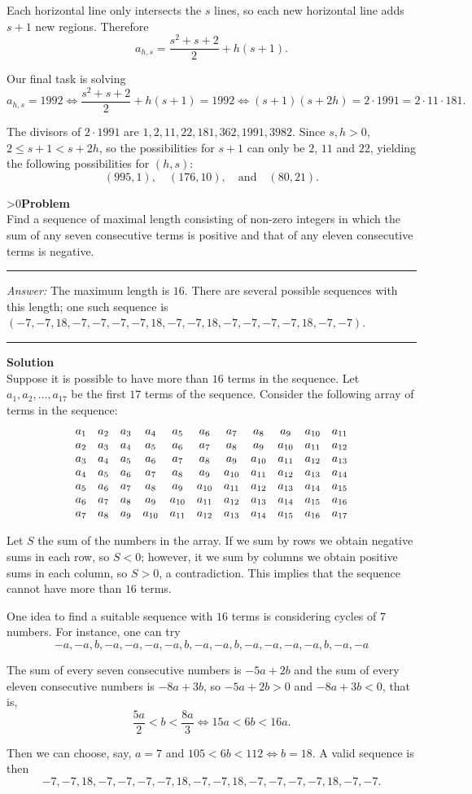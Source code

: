 \documentclass[12pt,oneside,a4paper]{book}
\newcounter{probnum}
\newcounter{solnum}
\newcommand{\prob}{\ifnum\value{probnum}>0\newpage\fi\setcounter{solnum}{0}\stepcounter{probnum}\textbf{Problem \theprobnum}\\}
\newcommand{\ans}{\medskip\hrule\medbreak\emph{Answer: }}
\newcommand{\sol}{\medskip\hrule\medbreak\textbf{Solution}\\}
\begin{document}
Each horizontal line only intersects the $s$ lines, so each new horizontal line adds $s+1$ new regions. Therefore
\[a_{h,s} = \frac{s^2+s+2}2 + h(s+1).\]

Our final task is solving
\[a_{h,s} = 1992\iff \frac{s^2+s+2}2 + h(s+1) = 1992 \iff (s+1)(s+2h) = 2\cdot 1991 = 2\cdot 11\cdot 181.\]

The divisors of $2\cdot 1991$ are $1,2,11,22,181,362,1991,3982$. Since $s,h>0$, $2\le s+1<s+2h$, so the possibilities for $s+1$ can only be $2$, $11$ and $22$, yielding the following possibilities for $(h,s)$:
\[(995,1),\quad (176,10),\quad\text{and}\quad (80,21).\]

\prob Find a sequence of maximal length consisting of non-zero integers in which the sum of any seven consecutive terms is positive and that of any eleven consecutive terms is negative.

\ans The maximum length is $16$. There are several possible sequences with this length; one such sequence is $(-7,-7,18,-7,-7,-7,-7,18,-7,-7,18,-7,-7,-7,-7,18,-7,-7)$.

\sol
Suppose it is possible to have more than $16$ terms in the sequence. Let $a_1,a_2,\ldots,a_{17}$ be the first $17$ terms of the sequence. Consider the following array of terms in the sequence:
\[\setcounter{MaxMatrixCols}{11}
\begin{matrix}
a_1& a_2& a_3& a_4& a_5& a_6& a_7& a_8& a_9& a_{10}& a_{11}\\
a_2& a_3& a_4& a_5& a_6& a_7& a_8& a_9& a_{10}& a_{11}& a_{12}\\
a_3& a_4& a_5& a_6& a_7& a_8& a_9& a_{10}& a_{11}& a_{12}& a_{13}\\
a_4& a_5& a_6& a_7& a_8& a_9& a_{10}& a_{11}& a_{12}& a_{13}& a_{14}\\
a_5& a_6& a_7& a_8& a_9& a_{10}& a_{11}& a_{12}& a_{13}& a_{14}& a_{15}\\
a_6& a_7& a_8& a_9& a_{10}& a_{11}& a_{12}& a_{13}& a_{14}& a_{15}& a_{16}\\
a_7& a_8& a_9& a_{10}& a_{11}& a_{12}& a_{13}& a_{14}& a_{15}& a_{16}& a_{17}
\end{matrix}\]

Let $S$ the sum of the numbers in the array. If we sum by rows we obtain negative sums in each row, so $S<0$; however, it we sum by columns we obtain positive sums in each column, so $S>0$, a contradiction. This implies that the sequence cannot have more than $16$ terms.

One idea to find a suitable sequence with $16$ terms is considering cycles of $7$ numbers. For instance, one can try
\[-a,-a,b,-a,-a,-a,-a,b,-a,-a,b,-a,-a,-a,-a,b,-a,-a\]

The sum of every seven consecutive numbers is $-5a+2b$ and the sum of every eleven consecutive numbers is $-8a+3b$, so $-5a+2b > 0$ and $-8a+3b < 0$, that is,
\[\frac{5a}2 < b < \frac{8a}3\iff 15a < 6b < 16a.\]

Then we can choose, say, $a=7$ and $105 < 6b < 112\iff b = 18$. A valid sequence is then
\[-7,-7,18,-7,-7,-7,-7,18,-7,-7,18,-7,-7,-7,-7,18,-7,-7.\]
\end{document}
